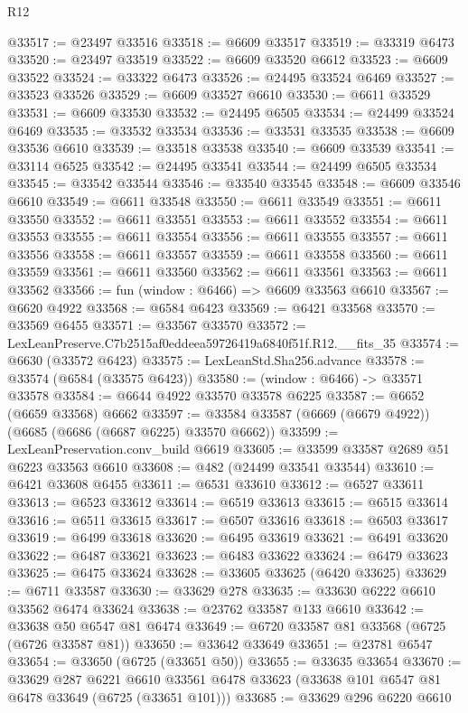 \begin{lexlean}{R12}
\begin{coremodule}
@33517 := @23497 @33516
@33518 := @6609 @33517
@33519 := @33319 @6473
@33520 := @23497 @33519
@33522 := @6609 @33520 @6612
@33523 := @6609 @33522
@33524 := @33322 @6473
@33526 := @24495 @33524 @6469
@33527 := @33523 @33526
@33529 := @6609 @33527 @6610
@33530 := @6611 @33529
@33531 := @6609 @33530
@33532 := @24495 @6505
@33534 := @24499 @33524 @6469
@33535 := @33532 @33534
@33536 := @33531 @33535
@33538 := @6609 @33536 @6610
@33539 := @33518 @33538
@33540 := @6609 @33539
@33541 := @33114 @6525
@33542 := @24495 @33541
@33544 := @24499 @6505 @33534
@33545 := @33542 @33544
@33546 := @33540 @33545
@33548 := @6609 @33546 @6610
@33549 := @6611 @33548
@33550 := @6611 @33549
@33551 := @6611 @33550
@33552 := @6611 @33551
@33553 := @6611 @33552
@33554 := @6611 @33553
@33555 := @6611 @33554
@33556 := @6611 @33555
@33557 := @6611 @33556
@33558 := @6611 @33557
@33559 := @6611 @33558
@33560 := @6611 @33559
@33561 := @6611 @33560
@33562 := @6611 @33561
@33563 := @6611 @33562
@33566 := fun (window : @6466) => @6609 @33563 @6610
@33567 := @6620 @4922
@33568 := @6584 @6423
@33569 := @6421 @33568
@33570 := @33569 @6455
@33571 := @33567 @33570
@33572 := LexLeanPreserve.C7b2515af0eddeea59726419a6840f51f.R12.__fits_35
@33574 := @6630 (@33572 @6423)
@33575 := LexLeanStd.Sha256.advance
@33578 := @33574 (@6584 (@33575 @6423))
@33580 := (window : @6466) -> @33571 @33578
@33584 := @6644 @4922 @33570 @33578 @6225
@33587 := @6652 (@6659 @33568) @6662
@33597 := @33584 @33587 (@6669 (@6679 @4922)) (@6685 (@6686 (@6687 @6225) @33570 @6662))
@33599 := LexLeanPreservation.conv_build @6619
@33605 := @33599 @33587 @2689 @51 @6223 @33563 @6610
@33608 := @482 (@24499 @33541 @33544)
@33610 := @6421 @33608 @6455
@33611 := @6531 @33610
@33612 := @6527 @33611
@33613 := @6523 @33612
@33614 := @6519 @33613
@33615 := @6515 @33614
@33616 := @6511 @33615
@33617 := @6507 @33616
@33618 := @6503 @33617
@33619 := @6499 @33618
@33620 := @6495 @33619
@33621 := @6491 @33620
@33622 := @6487 @33621
@33623 := @6483 @33622
@33624 := @6479 @33623
@33625 := @6475 @33624
@33628 := @33605 @33625 (@6420 @33625)
@33629 := @6711 @33587
@33630 := @33629 @278
@33635 := @33630 @6222 @6610 @33562 @6474 @33624
@33638 := @23762 @33587 @133 @6610
@33642 := @33638 @50 @6547 @81 @6474
@33649 := @6720 @33587 @81 @33568 (@6725 (@6726 @33587 @81))
@33650 := @33642 @33649
@33651 := @23781 @6547
@33654 := @33650 (@6725 (@33651 @50))
@33655 := @33635 @33654
@33670 := @33629
    @287
    @6221
    @6610
    @33561
    @6478
    @33623
    (@33638 @101 @6547 @81 @6478 @33649 (@6725 (@33651 @101)))
@33685 := @33629
    @296
    @6220
    @6610

\end{coremodule}
\end{lexlean}
